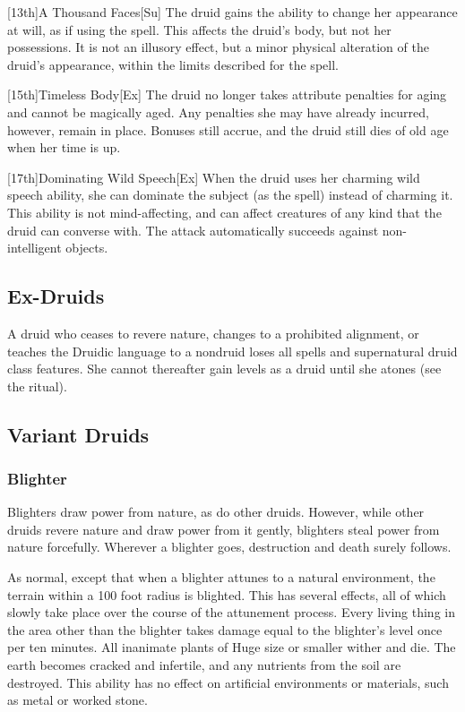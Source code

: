 [13th]{A Thousand Faces}[Su] The druid gains the ability to change her appearance at will, as if using the 
spell.
This affects the druid's body, but not her possessions.
It is not an illusory effect, but a minor physical alteration of the druid's appearance, within the limits described for the spell.

[15th]{Timeless Body}[Ex]
The druid no longer takes attribute penalties for aging and cannot be magically aged.
Any penalties she may have already incurred, however, remain in place.
Bonuses still accrue, and the druid still dies of old age when her time is up.

[17th]{Dominating Wild Speech}[Ex]
When the druid uses her charming wild speech ability, she can dominate the subject (as the 
spell) instead of charming it.
This ability is not mind-affecting, and can affect creatures of any kind that the druid can converse with.
The attack automatically succeeds against non-intelligent objects.

\subsection{Ex-Druids}
A druid who ceases to revere nature, changes to a prohibited alignment, or teaches the Druidic language to a nondruid loses all spells and supernatural druid class features.
She cannot thereafter gain levels as a druid until she atones (see the  ritual).

\subsection{Variant Druids}

\subsubsection{Blighter}

Blighters draw power from nature, as do other druids. However, while other druids revere nature and draw power from it gently, blighters steal power from nature forcefully. Wherever a blighter goes, destruction and death surely follows.

 As normal, except that when a blighter attunes to a natural environment, the terrain within a 100 foot radius is blighted.
This has several effects, all of which slowly take place over the course of the attunement process.
Every living thing in the area other than the blighter takes damage equal to the blighter's level once per ten minutes.
All inanimate plants of Huge size or smaller wither and die.
The earth becomes cracked and infertile, and any nutrients from the soil are destroyed.
This ability has no effect on artificial environments or materials, such as metal or worked stone.

